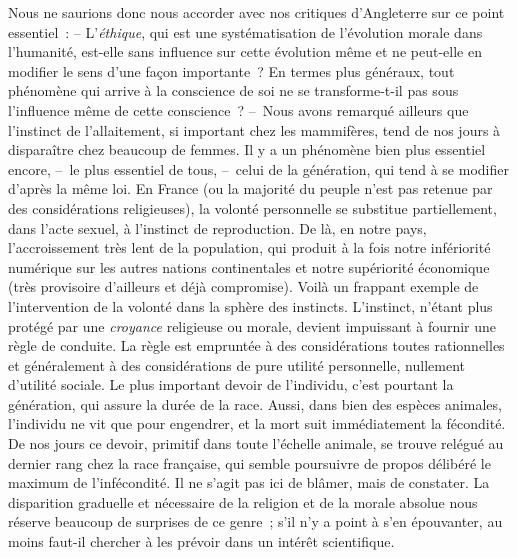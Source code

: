 \documentclass[french,twoside]{book} %
\begin{document}
Nous ne saurions donc nous accorder avec nos critiques d’Angleterre sur ce point essentiel : – L’\emph{éthique}, qui est une systématisation de l’évolution morale dans l’humanité, est-elle sans influence sur cette évolution même et ne peut-elle en modifier le sens d’une façon importante ? En termes plus généraux, tout phénomène qui arrive à la conscience de soi ne se transforme-t-il pas sous l’influence même de cette conscience ? – Nous avons remarqué ailleurs que l’instinct de l’allaitement, si important chez les mammifères, tend de nos jours à disparaître chez beaucoup de femmes. Il y a un phénomène bien plus essentiel encore, – le plus essentiel de tous, – celui de la génération, qui tend à se modifier d’après la même loi. En France (ou la majorité du peuple n’est pas retenue par des considérations religieuses), la volonté personnelle se substitue partiellement, dans l’acte sexuel, à l’instinct de reproduction. De là, en notre pays, l’accroissement très lent de la population, qui produit à la fois notre infériorité numérique sur les autres nations continentales et notre supériorité économique (très provisoire d’ailleurs et déjà compromise). Voilà un frappant exemple de l’intervention de la volonté dans la sphère des instincts. L’instinct, n’étant plus protégé par une \emph{croyance} religieuse ou morale, devient impuissant à fournir une règle de conduite. La règle est empruntée à des considérations toutes rationnelles et généralement à des considérations de pure utilité personnelle, nullement d’utilité sociale. Le plus important devoir de l’individu, c’est pourtant la génération, qui assure la durée de la race. Aussi, dans bien des espèces animales, l’individu ne vit que pour engendrer, et la mort suit immédiatement la fécondité. De nos jours ce devoir, primitif dans toute l’échelle animale, se trouve relégué au dernier rang chez la race française, qui semble poursuivre de propos délibéré le maximum de l’infécondité. Il ne s’agit pas ici de blâmer, mais de constater. La disparition graduelle et nécessaire de la religion et de la morale absolue nous réserve beaucoup de surprises de ce genre ; s’il n’y a point à s’en épouvanter, au moins faut-il chercher à les prévoir dans un intérêt scientifique.\par
\end{document}
